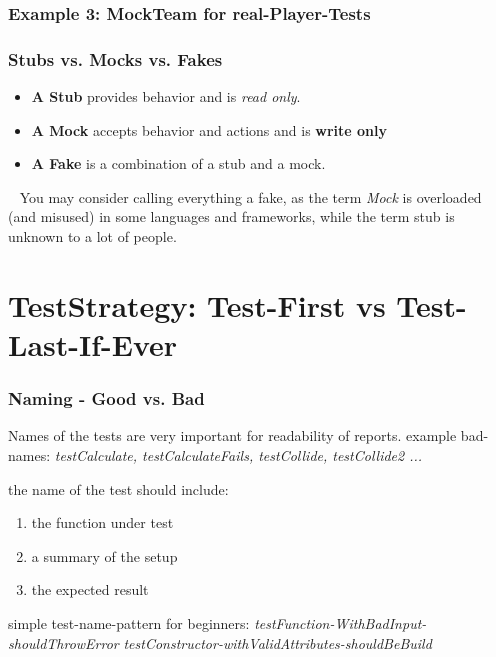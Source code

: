 \documentclass[12pt]{beamer}
\begin{document}
	\begin{frame}
		\frametitle{Example 3: MockTeam for real-Player-Tests}
	\end{frame}
	
	\begin{frame}
		\frametitle{Stubs vs. Mocks vs. Fakes}
		
		\begin{itemize}
			\item \textbf{A Stub} provides behavior and is \textit{read only}. 
			\item \textbf{A Mock} accepts behavior and actions and is \textbf{write only}
			\item \textbf{A Fake} is a combination of a stub and a mock. 
		\end{itemize}
	
		~\newline
		You may consider calling everything a fake, as the term \textit{Mock} is overloaded (and misused) in some languages and frameworks, while the term stub is unknown to a lot of people.  
	\end{frame}
	
	\section{TestStrategy: Test-First vs Test-Last-If-Ever}
	
	\begin{frame}
		\frametitle{Naming - Good vs. Bad}
		Names of the tests are very important for readability of reports. 
		example bad-names: \textit{testCalculate, testCalculateFails, testCollide, testCollide2 ...}
		
		the name of the test should include:
		\begin{enumerate}
			\item the function under test
			\item a summary of the setup 
			\item the expected result
		\end{enumerate}
	
		simple test-name-pattern for beginners: \newline
		\textit{testFunction-WithBadInput-shouldThrowError} \newline
		\textit{testConstructor-withValidAttributes-shouldBeBuild}
	\end{frame}
	
\end{document}
